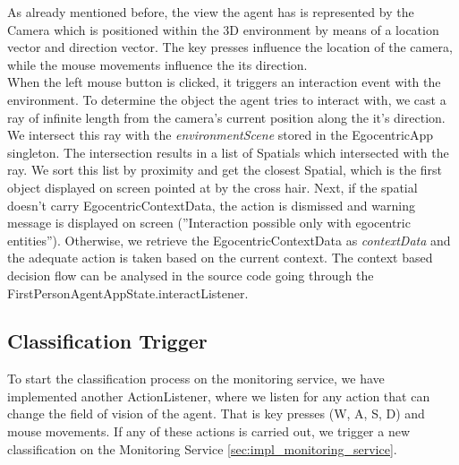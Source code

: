 As already mentioned before, the view the agent has is represented by the Camera which is positioned within the 3D environment by means of a location vector and direction vector. The key presses influence the location of the camera, while the mouse movements influence the its direction.\\

When the left mouse button is clicked, it triggers an interaction event with the environment. To determine the object the agent tries to interact with, we cast a ray of infinite length from the camera's current position along the it's direction. We intersect this ray with the \emph{environmentScene} stored in the EgocentricApp singleton. The intersection results in a list of Spatials which intersected with the ray. We sort this list by proximity and get the closest Spatial, which is the first object displayed on screen pointed at by the cross hair. Next, if the spatial doesn't carry EgocentricContextData, the action is dismissed and warning message is displayed on screen (''Interaction possible only with egocentric entities''). Otherwise, we retrieve the EgocentricContextData as \emph{contextData} and the adequate action is taken based on the current context. The context based decision flow can be analysed in the source code going through the FirstPersonAgentAppState.interactListener.\\

\subsection{Classification Trigger} %
\label{subsec:impl_classification_trigger}
To start the classification process on the monitoring service, we have implemented another ActionListener, where we listen for any action that can change the field of vision of the agent. That is key presses (W, A, S, D) and mouse movements. If any of these actions is carried out, we trigger a new classification on the Monitoring Service \ref{sec:impl_monitoring_service}.


